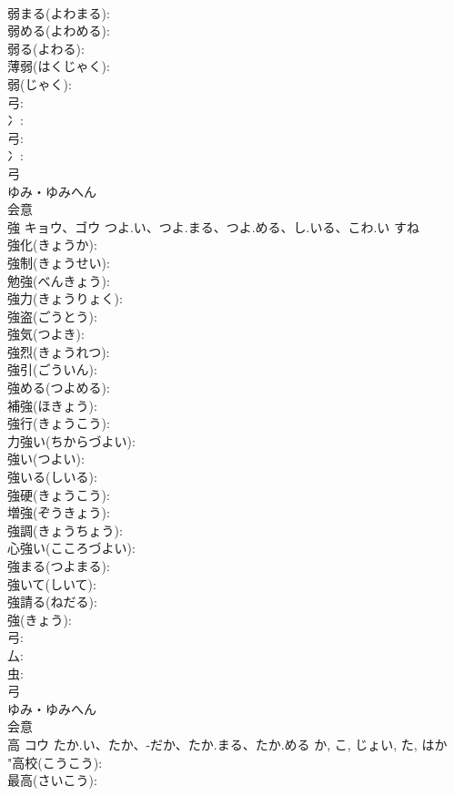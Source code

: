 \documentclass[8pt]{extreport}
\begin{document}
\begin{CJK}{UTF8}{min}
\\	弱まる(よわまる): 
\\	弱める(よわめる): 
\\	弱る(よわる): 
\\	薄弱(はくじゃく): 
\\	弱(じゃく): 
\\	弓: 
\\	冫: 
\\	弓: 
\\	冫: 
\\	弓	
\\	ゆみ・ゆみへん	
\\	会意 
\\	強	キョウ、ゴウ	つよ.い、つよ.まる、つよ.める、し.いる、こわ.い	すね	
\\	強化(きょうか): 
\\	強制(きょうせい): 
\\	勉強(べんきょう): 
\\	強力(きょうりょく): 
\\	強盗(ごうとう): 
\\	強気(つよき): 
\\	強烈(きょうれつ): 
\\	強引(ごういん): 
\\	強める(つよめる): 
\\	補強(ほきょう): 
\\	強行(きょうこう): 
\\	力強い(ちからづよい): 
\\	強い(つよい): 
\\	強いる(しいる): 
\\	強硬(きょうこう): 
\\	増強(ぞうきょう): 
\\	強調(きょうちょう): 
\\	心強い(こころづよい): 
\\	強まる(つよまる): 
\\	強いて(しいて): 
\\	強請る(ねだる): 
\\	強(きょう): 
\\	弓: 
\\	厶: 
\\	虫: 
\\	弓	
\\	ゆみ・ゆみへん	
\\	会意 
\\	高	コウ	たか.い、たか、-だか、たか.まる、たか.める	か, こ, じょい, た, はか	
\\	"高校(こうこう): 
\\	最高(さいこう): 

\end{CJK}
\end{document}
